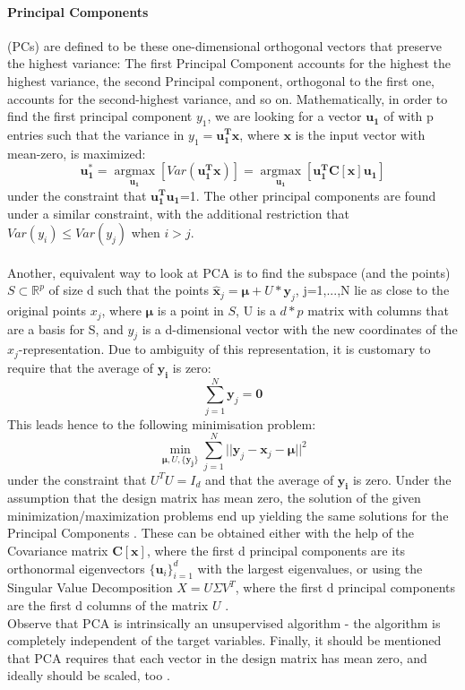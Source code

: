 \documentclass[11pt,a4paper,notitlepage]{article}
\begin{document}
\paragraph*{Principal Components} (PCs) are defined to be these one-dimensional orthogonal vectors that preserve the highest variance: The first Principal Component accounts for the highest the highest variance, the second Principal component, orthogonal to the first one, accounts for the second-highest variance, and so on. Mathematically, in order to find the first principal component $y_1$, we are looking for a  vector $\mathbf{u_1}$ of with p entries  such that the variance in $y_1=\mathbf{u_1^Tx}$, where $\mathbf{x}$ is the input vector with mean-zero, is maximized:
\begin{equation*}
    \mathbf{u_1^*}=\operatorname*{argmax}_{\mathbf{u_1}} [Var(\mathbf{u_1^Tx})]=\operatorname*{argmax}_{\mathbf{u_1}} [\mathbf{u_1^T}\boldsymbol{C}[\boldsymbol{x}]\mathbf{u_1}]
\end{equation*}
under the constraint that  $\mathbf{u_1^Tu_1}$=1. The other principal components are found under a similar constraint, with the additional restriction that $Var(y_i) \leq Var(y_j)$ when $i>j$.\\\\ Another, equivalent way to look at PCA is to find the subspace (and the points) $S \subset \mathbb{R}^p$ of size d such that the points $\mathbf{\hat{x}}_j=\mathbf{\mu}+U*\mathbf{y}_j$, j=1,...,N lie as close to the original points $x_j$, where $\mathbf{\mu}$ is a point in $S$, U is a $d * p$  matrix with columns that are a basis for S, and $y_j$ is a d-dimensional vector with the new coordinates of the $x_j$-representation. Due to ambiguity of this representation, it is customary to require that the average of $\mathbf{y_i}$ is zero:
\begin{equation}
    \sum_{j=1}^N\mathbf{y}_j=\mathbf{0}    
\end{equation}
This leads hence to the following minimisation problem:
\begin{equation}
    \operatorname*{min}_{\mathbf{\mu},U,\{\mathbf{y_j}\}} \sum_{j=1}^N||\mathbf{y}_j-\mathbf{x}_j-\mathbf{\mu}||^2
\end{equation}
under the constraint that $U^TU=I_d$ and that the average of $\mathbf{y_i}$ is zero. Under the assumption that the design matrix has mean zero, the solution of the given minimization/maximization problems end up yielding the same solutions for the Principal Components \citep{Generalized_PCA}. These can be obtained either with the help of the Covariance matrix $\boldsymbol{C}[\boldsymbol{x}]$, where the first d principal components are its orthonormal eigenvectors  $\{\mathbf{u}_i\}_{i=1}^d$ with the largest eigenvalues, or using the Singular Value Decomposition $X=U\Sigma V^T$, where the first d principal components are the first d columns of the matrix $U$ \citep{Generalized_PCA}. \\
Observe that PCA is intrinsically an unsupervised algorithm \citep{hastie} - the algorithm is completely independent of the target variables. Finally, it should be mentioned that PCA requires that each vector in the design matrix has mean zero, and ideally should be scaled, too \citep{handsOnMachineLearning}.
\end{document}
